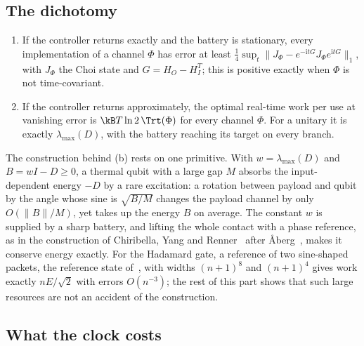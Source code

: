 \FloatBarrier
\subsection{The dichotomy}\label{kt:sec:dichotomy}

\begin{theorem}\label{kt:thm:dichotomy}\leavevmode
\begin{enumerate}[label=(\alph*)]
\item If the controller returns exactly and the battery is stationary, every implementation of a channel $\Phi$ has error at least $\frac14\sup_t\|J_\Phi-e^{-\mathrm itG}J_\Phi e^{\mathrm itG}\|_1$, with $J_\Phi$ the Choi state and $G=H_O-H_I^T$; this is positive exactly when $\Phi$ is not time-covariant.
\item If the controller returns approximately, the optimal real-time work per use at vanishing error is $\kB T\ln2\,\Trt(\Phi)$ for every channel $\Phi$. For a unitary it is exactly $\lambda_{\max}(D)$, with the battery reaching its target on every branch.
\end{enumerate}
\end{theorem}

The construction behind (b) rests on one primitive. With $w=\lambda_{\max}(D)$ and $B=wI-D\ge0$, a thermal qubit with a large gap $M$ absorbs the input-dependent energy $-D$ by a rare excitation: a rotation between payload and qubit by the angle whose sine is $\sqrt{B/M}$ changes the payload channel by only $O(\|B\|/M)$, yet takes up the energy $B$ on average. The constant $w$ is supplied by a sharp battery, and lifting the whole contact with a phase reference, as in the construction of Chiribella, Yang and Renner~\cite{ChiribellaYangRenner21} after {\AA}berg~\cite{Aberg14}, makes it conserve energy exactly. For the Hadamard gate, a reference of two sine-shaped packets, the reference state of~\cite{ChiribellaYangRenner21}, with widths $(n+1)^8$ and $(n+1)^4$ gives work exactly $nE/\sqrt2$ with errors $O(n^{-3})$; the rest of this part shows that such large resources are not an accident of the construction.

\subsection{What the clock costs}\label{kt:sec:costs}

